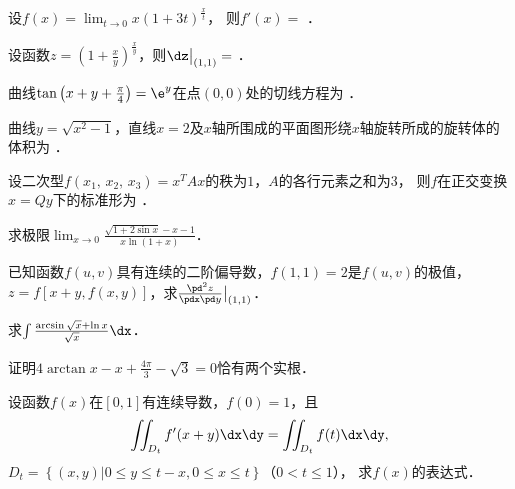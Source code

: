 \documentclass[plain,noanswer,medmath]{../../template/jnuexam}
\begin{document}


\begin{problem}
设$f(x) = \lim_{t \to 0} x(1 + 3t)^{\frac{x}{t}}$，
则$f'(x) =$ \fillin{}．
\end{problem}


\begin{problem}
设函数$z = \left(1 + \frac{x}{y} \right)^{\frac{x}{y}}$，则$\dz\big|_{(1,1)} =$ \fillin{}．
\end{problem}


\begin{problem}
曲线$\tan \left(x + y + \frac{\pi}{4} \right) = \e^{y}$在点$\left(0,0 \right)$处的切线方程为 \fillin{}．
\end{problem}


\begin{problem}
曲线$y = \sqrt{x^{2} - 1}$，直线$x = 2$及$x$轴所围成的平面图形绕$x$轴旋转所成的旋转体的体积为 \fillin{}．
\end{problem}


\begin{problem}
设二次型$f\left(x_{1},\,x_{2},\,x_{3} \right) = x^T Ax$的秩为$1$，$A$的各行元素之和为$3$，
则$f$在正交变换$x = Qy$下的标准形为 \fillin{}．
\end{problem}






\begin{problem}[points=10]
求极限$\lim_{x \to 0} \frac{\sqrt{1 + 2\sin x} - x - 1}{x\ln \left(1 + x \right)}$．
\end{problem}


\begin{problem}[points=10]
已知函数$f(u,v)$具有连续的二阶偏导数，$f(1,1) = 2$是$f(u,v)$的极值，
$z = f[x+y, f(x,y)]$，求$\frac{\pd^2 z}{\pdx\pd y}\big|_{(1,1)}$．
\end{problem}


\begin{problem}[points=10]
求$\int \frac{\arcsin \sqrt{x} + \ln x}{\sqrt{x}} \dx$．
\end{problem}


\begin{problem}[points=10]
证明$4\arctan x - x + \frac{4\pi}{3} - \sqrt{3} = 0$恰有两个实根．
\end{problem}


\begin{problem}[points=10]
设函数$f(x)$在$[0,1]$有连续导数，$f(0) = 1$，且
$$\iint_{D_t} f'(x + y)\dx\dy = \iint_{D_t} f(t)\dx\dy,$$ 
$D_t = \left\{(x,y)\left| 0 \le y \le t - x,0 \le x \le t \right. \right\}$（$0 < t \le 1$），
求$f(x)$的表达式．
\end{problem}
\end{document}
